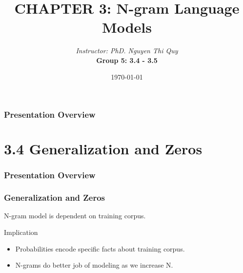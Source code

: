 \documentclass[13.5pt,aspecratio=169]{beamer}
\title{CHAPTER 3: N-gram Language Models}
\author[Group 5]{\textit{Instructor: PhD. Nguyen Thi Quy}\\ \bigskip \textbf{Group 5: 3.4 - 3.5}}
\date{\today}
\begin{document}
\maketitle



\begin{frame}
    \doublespacing
        \frametitle{Presentation Overview} %
        
        \tableofcontents %
\end{frame}
    
    
    \section{3.4 Generalization and Zeros} %
    \begin{frame}
        \doublespacing
            \frametitle{Presentation Overview} %
            
            \tableofcontents[currentsection] %
    \end{frame}


    \begin{frame}
        \frametitle{Generalization and Zeros}
     
            N-gram model is dependent on training corpus.
            
            \begin{block}{Implication}
                 \begin{itemize}
                   \item Probabilities encode specific facts about training corpus.
                   \item N-grams do better job of modeling as we increase N.
                \end{itemize}
            \end{block}
        
    \end{frame}
    
\end{document}

